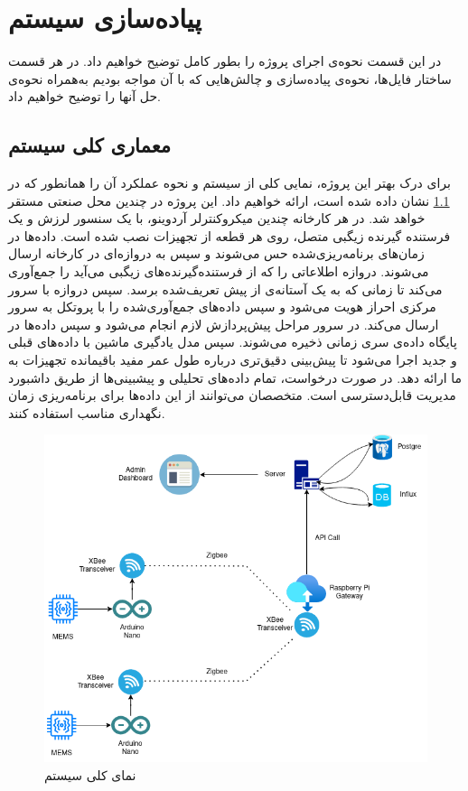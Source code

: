 \chapter{پیاده‌سازی سیستم}

در این قسمت نحوه‌ی اجرای پروژه را بطور کامل توضیح خواهیم داد. در هر قسمت ساختار فایل‌ها، نحوه‌ی پیاده‌سازی و چالش‌هایی که با آن مواجه بودیم به‌همراه نحوه‌ی حل آنها را توضیح خواهیم داد.

\section{معماری کلی سیستم}

برای درک بهتر این پروژه، نمایی کلی از سیستم و نحوه عملکرد آن را همانطور که در \cref{fig:system_overview} نشان داده شده است، ارائه خواهیم داد. این پروژه در چندین محل صنعتی مستقر خواهد شد. در هر کارخانه چندین میکروکنترلر آردوینو، با یک سنسور لرزش و یک فرستنده گیرنده زیگبی متصل، روی هر قطعه از تجهیزات نصب شده است. داده‌ها در زمان‌های برنامه‌ریزی‌شده حس می‌شوند و سپس به دروازه‌ای در کارخانه ارسال می‌شوند. دروازه اطلاعاتی را که از فرستنده‌گیرنده‌های زیگبی می‌آید را جمع‌آوری می‌کند تا زمانی که به یک آستانه‌ی از پیش تعریف‌شده برسد. سپس دروازه با سرور مرکزی احراز هویت می‌شود و سپس داده‌های جمع‌آوری‌شده را با پروتکل  به سرور ارسال می‌کند. در سرور مراحل پیش‌پردازش لازم انجام می‌شود و سپس داده‌ها در پایگاه داده‌ی سری زمانی ذخیره می‌شوند. سپس مدل یادگیری ماشین با داده‌های قبلی و جدید اجرا می‌شود تا پیش‌بینی دقیق‌تری درباره طول عمر مفید باقیمانده تجهیزات به ما ارائه دهد. در صورت درخواست، تمام داده‌های تحلیلی و پیشبینی‌ها از طریق داشبورد مدیریت قابل‌دسترسی است. متخصصان می‌توانند از این داده‌ها برای برنامه‌ریزی زمان نگهداری مناسب استفاده کنند.

\begin{figure}[!h]
\centering\includegraphics[scale=.6]{system_overview.png}
\caption{نمای کلی سیستم}\label{fig:system_overview}
\end{figure}

